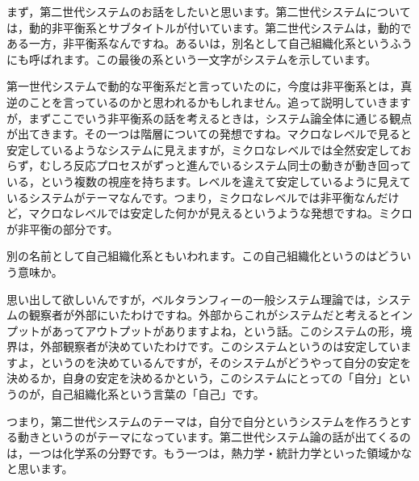 \documentclass{ltjsbook}
\begin{document}
まず，第二世代システムのお話をしたいと思います。第二世代システムについては，動的非平衡系とサブタイトルが付いています。第二世代システムは，動的である一方，非平衡系なんですね。あるいは，別名として自己組織化系というふうにも呼ばれます。この最後の系という一文字がシステムを示しています。

第一世代システムで動的な平衡系だと言っていたのに，今度は非平衡系とは，真逆のことを言っているのかと思われるかもしれません。追って説明していきますが，まずここでいう非平衡系の話を考えるときは，システム論全体に通じる観点が出てきます。その一つは階層についての発想ですね。マクロなレベルで見ると安定しているようなシステムに見えますが，ミクロなレベルでは全然安定しておらず，むしろ反応プロセスがずっと進んでいるシステム同士の動きが動き回っている，という複数の視座を持ちます。レベルを違えて安定しているように見えているシステムがテーマなんです。つまり，ミクロなレベルでは非平衡なんだけど，マクロなレベルでは安定した何かが見えるというような発想ですね。ミクロが非平衡の部分です。


別の名前として自己組織化系ともいわれます。この自己組織化というのはどういう意味か。

思い出して欲しいんですが，ベルタランフィーの一般システム理論では，システムの観察者が外部にいたわけですね。外部からこれがシステムだと考えるとインプットがあってアウトプットがありますよね，という話。このシステムの形，境界は，外部観察者が決めていたわけです。このシステムというのは安定していますよ，というのを決めているんですが，そのシステムがどうやって自分の安定を決めるか，自身の安定を決めるかという，このシステムにとっての「自分」というのが，自己組織化系という言葉の「自己」です。

つまり，第二世代システムのテーマは，自分で自分というシステムを作ろうとする動きというのがテーマになっています。第二世代システム論の話が出てくるのは，一つは化学系の分野です。もう一つは，熱力学・統計力学といった領域かなと思います。
\end{document}

